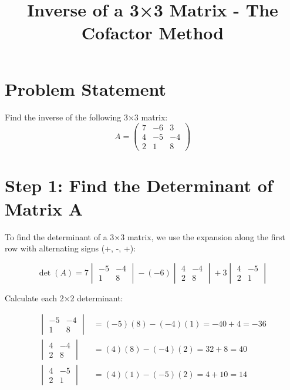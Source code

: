 \documentclass[12pt]{article}
\title{\textbf{Inverse of a 3×3 Matrix - The Cofactor Method}}
\author{}
\date{}
\begin{document}
\maketitle

\section{Problem Statement}
Find the inverse of the following 3×3 matrix:
\[
A = \begin{pmatrix}
7 & -6 & 3 \\
4 & -5 & -4 \\
2 & 1 & 8
\end{pmatrix}
\]

\section{Step 1: Find the Determinant of Matrix A}

To find the determinant of a 3×3 matrix, we use the expansion along the first row with alternating signs (+, -, +):

\[
\det(A) = 7 \begin{vmatrix} -5 & -4 \\ 1 & 8 \end{vmatrix} - (-6) \begin{vmatrix} 4 & -4 \\ 2 & 8 \end{vmatrix} + 3 \begin{vmatrix} 4 & -5 \\ 2 & 1 \end{vmatrix}
\]

Calculate each 2×2 determinant:

\begin{align}
\begin{vmatrix} -5 & -4 \\ 1 & 8 \end{vmatrix} &= (-5)(8) - (-4)(1) = -40 + 4 = -36 \\
\begin{vmatrix} 4 & -4 \\ 2 & 8 \end{vmatrix} &= (4)(8) - (-4)(2) = 32 + 8 = 40 \\
\begin{vmatrix} 4 & -5 \\ 2 & 1 \end{vmatrix} &= (4)(1) - (-5)(2) = 4 + 10 = 14
\end{align}
\end{document}
